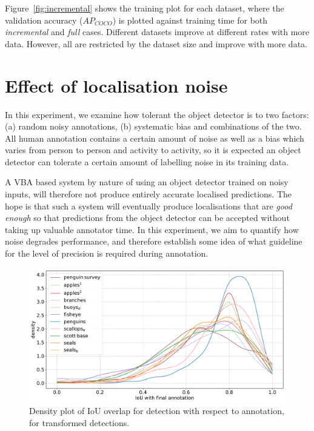 \documentclass[conference]{IEEEtran}
\begin{document}
Figure~\ref{fig:incremental} shows the training plot for each dataset, where the validation accuracy ($AP_{COCO}$) is plotted against training time for both \emph{incremental} and \emph{full} cases. Different datasets improve at different rates with more data. However, all are restricted by the dataset size and improve with more data.



\section{Effect of localisation noise}


In this experiment, we examine how tolerant the object detector is to two factors: (a) random noisy annotations, (b) systematic bias and combinations of the two. All human annotation contains a certain amount of noise as well as a bias which varies from person to person and activity to activity, so it is expected an object detector can tolerate a certain amount of labelling noise in its training data. 

A \gls{VBA} based system by nature of using an object detector trained on noisy inputs, will therefore not produce entirely accurate localised predictions. The hope is that such a system will eventually produce localisations that are \emph{good enough} so that predictions from the object detector can be accepted without taking up valuable annotator time. In this experiment, we aim to quantify how noise degrades performance, and therefore establish some idea of what guideline for the level of precision is required during annotation.

\begin{figure}[!h]
\centering
\includegraphics[width=1.0\linewidth]{figures/iou_dataset.pdf}
\caption{ Density plot of IoU overlap for detection with respect to annotation, for transformed detections. }
\label{fig:density_iou}
\end{figure}
\end{document}
